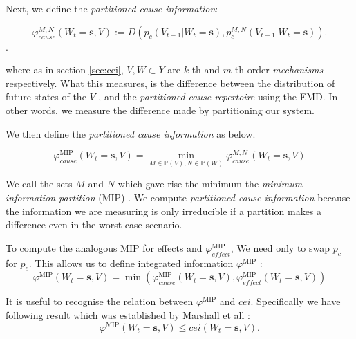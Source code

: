 Next, we define the \textit{partitioned cause information}:

\begin{equation}
\label{def:phi2}
\varphi_{cause}^{M,N}(W_t=\mathbf{s}, V) := D \left( p_c(V_{t-1}|W_t=\mathbf{s}) ,p^{M,N}_c(V_{t-1}|W_{t} = \mathbf{s})  \right).
\end{equation}.

where as in section \ref{sec:cei}, $V, W \subset Y$ are $k$-th and $m$-th order \textit{mechanisms} respectively. What this measures, is the difference between the distribution of future states of the $V$ , and the \textit{partitioned cause repertoire} using the EMD. In other words, we measure the difference made by partitioning our system.

We then define the \textit{partitioned cause information} as below.

\begin{equation}
\label{def:phi3}
\varphi_{cause}^{\text{MIP}}(W_t=\mathbf{s}, V)  =\min \limits_{M \in \mathbb{P}(V), N \in \mathbb{P}(W)} \varphi_{cause}^{M,N}(W_t=\mathbf{s}, V) 
\end{equation}

We call the sets $M$ and $N$ which gave rise the minimum the \textit{minimum information partition} (MIP) \cite{oizumi2014phenomenology}. We compute \textit{partitioned cause information} because the information we are measuring is only irreducible if a partition makes a difference even in the worst case scenario.


To compute the analogous MIP for effects and $\varphi^{\text{MIP}}_{effect}$, We need only to swap $p_c$ for $p_e$. This allows us to define integrated information $\varphi^{\text{MIP}}$ \cite{oizumi2014phenomenology}:
\begin{equation}
\label{def:phi}
\varphi^{\text{MIP}}(W_t=\mathbf{s}, V) = \min \left( \varphi_{cause}^{\text{MIP}}(W_t=\mathbf{s}, V), \varphi_{effect}^{\text{MIP}}(W_t=\mathbf{s}, V)  \right) 
\end{equation}



It is useful to recognise the relation between $\varphi^{\text{MIP}}$ and $cei$. Specifically we have following result which was established by Marshall et all \cite{marshall2016integrated}:
\begin{equation}
\label{eq:bound_phi_cei}
\varphi^{\text{MIP}}(W_t=\mathbf{s}, V) \leq cei(W_t=\mathbf{s},V) .
\end{equation}

